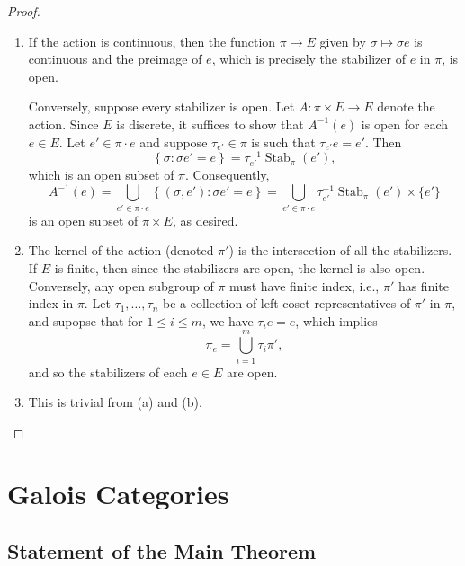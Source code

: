 \documentclass[10pt]{article}
\theoremstyle{thmstyle}
\theoremstyle{defstyle}
\renewcommand{\le}{\leqslant}
\newcommand{\Stab}{\operatorname{Stab}}
\begin{document}
\begin{proof}
\begin{enumerate}[label=(\arabic*)]
    \item If the action is continuous, then the function $\pi\to E$ given by $\sigma\mapsto \sigma e$ is continuous and the preimage of $e$, which is precisely the stabilizer of $e$ in $\pi$, is open. 
    
    Conversely, suppose every stabilizer is open. Let $A: \pi\times E\to E$ denote the action. Since $E$ is discrete, it suffices to show that $A^{-1}(e)$ is open for each $e\in E$. Let $e'\in\pi\cdot e$ and suppose $\tau_{e'}\in\pi$ is such that $\tau_{e'} e = e'$. Then 
    \begin{equation*}
        \left\{\sigma\colon \sigma e' = e\right\} = \tau_{e'}^{-1}\Stab_{\pi}(e'),
    \end{equation*}
    which is an open subset of $\pi$. Consequently, 
    \begin{equation*}
        A^{-1}(e) = \bigcup_{e'\in\pi\cdot e} \left\{(\sigma, e')\colon \sigma e' = e\right\} = \bigcup_{e'\in\pi\cdot e}\tau_{e'}^{-1}\Stab_\pi(e')\times\{e'\}
    \end{equation*}
    is an open subset of $\pi\times E$, as desired.
    \item The kernel of the action (denoted $\pi'$) is the intersection of all the stabilizers. If $E$ is finite, then since the stabilizers are open, the kernel is also open. Conversely, any open subgroup of $\pi$ must have finite index, i.e., $\pi'$ has finite index in $\pi$. Let $\tau_1,\dots,\tau_n$ be a collection of left coset representatives of $\pi'$ in $\pi$, and supopse that for $1\le i\le m$, we have $\tau_i e = e$, which implies 
    \begin{equation*}
        \pi_e = \bigcup_{i = 1}^m\tau_i\pi',
    \end{equation*}
    and so the stabilizers of each $e\in E$ are open. 

    \item This is trivial from (a) and (b). \qedhere
\end{enumerate}
\end{proof}

\newpage
\section{Galois Categories}

\subsection{Statement of the Main Theorem}
\end{document}
